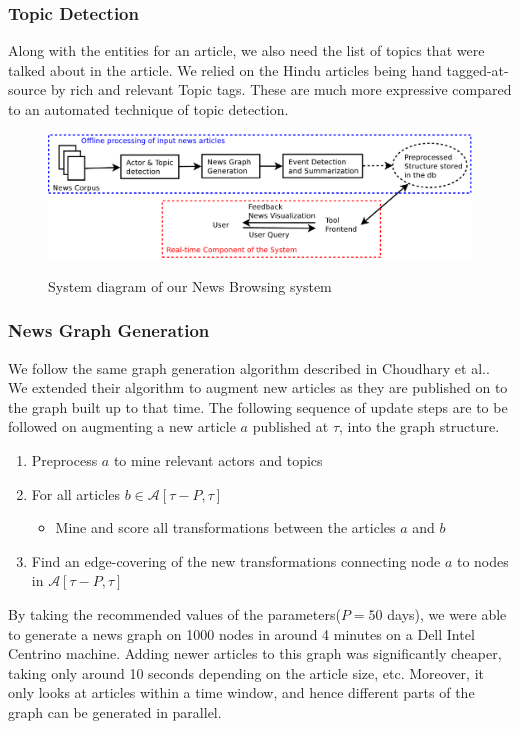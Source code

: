\subsubsection*{Topic Detection}
Along with the entities for an article, we also need the list of topics that were talked about in the article. 
We relied on the Hindu articles being hand tagged-at-source by rich and relevant Topic tags. These are much more expressive compared to an automated technique of topic detection.
\begin{figure}
\caption{System diagram of our News Browsing system}
\includegraphics[scale=0.24]{figures/system-design.pdf}
\label{fig:block-system-design}
\end{figure}

\subsubsection*{News Graph Generation}\label{sec:graph-desc}
We follow the same graph generation algorithm described in Choudhary et al.\cite{choudhary@ecir2008}. We extended their algorithm to
augment new articles as they are published on to the graph built up to that time. The following sequence of update steps are to
be followed on augmenting a new article $a$ published at $\tau$, into the graph structure.
\begin{enumerate}
  \item Preprocess $a$ to mine relevant actors and topics
  \item For all articles $b \in \mathcal{A}[\tau - P, \tau]$
  \begin{itemize}
  \item Mine and score all transformations between the articles $a$ and $b$
  \end{itemize}
  \item Find an edge-covering of the new transformations connecting node $a$ to nodes in $\mathcal{A}[\tau - P, \tau]$
\end{enumerate}

By taking the recommended values of the parameters($P=50$ days), we were able to generate a news graph on 1000 nodes in around 4 minutes on a Dell Intel Centrino machine.
Adding newer articles to this graph was significantly cheaper, taking only around 10 seconds depending on the article size, etc.
Moreover, it only looks at articles within a time window, and hence different parts of the graph can be generated in parallel.

